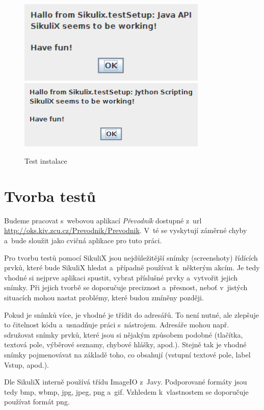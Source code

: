 	\begin{figure}[ht!]
		\centering
		\caption{Test instalace}
		\label{InstalOK}
		\includegraphics[width=9cm]{img/Instalace/InstalaceOK.png}\\[0.3cm]
		\includegraphics[width=9cm]{img/Instalace/InstalaceOK1.png}
	\end{figure}
	
	\section{Tvorba testů}
	Budeme pracovat s~webovou aplikací \emph{Převodník} dostupné z~url \url{http://oks.kiv.zcu.cz/Prevodnik/Prevodnik}. V~té se vyskytují záměrné chyby a~bude sloužit jako cvičná aplikace pro tuto práci.
	
	Pro tvorbu testů pomocí SikuliX jsou nejdůležitější snímky (screenshoty) řídících prvků, které bude SikuliX hledat a~případně používat k~některým akcím. Je tedy vhodné si nejprve aplikaci spustit, vybrat příslušné prvky a~vytvořit jejich snímky. Při jejich tvorbě se doporučuje preciznost a~přesnost, neboť v~jistých situacích mohou nastat problémy, které budou zmíněny později.
	
	Pokud je snímků více, je vhodné je třídit do adresářů. To není nutné, ale zlepšuje to čitelnost kódu a~usnadňuje práci s~nástrojem. Adresáře mohou např. sdružovat snímky prvků, které jsou si nějakým způsobem podobné (tlačítka, textová pole, výběrové seznamy, chybové hlášky, apod.). Stejně tak je vhodné snímky pojmenovávat na základě toho, co obsahují (vstupní textové pole, label Vstup, apod.).
	
	Dle \citep{SikuliXImgs} SikuliX interně používá třídu ImageIO z~Javy. Podporované formáty jsou tedy bmp, wbmp, jpg, jpeg, png a~gif. Vzhledem k~vlastnostem se doporučuje používat formát png.
	

